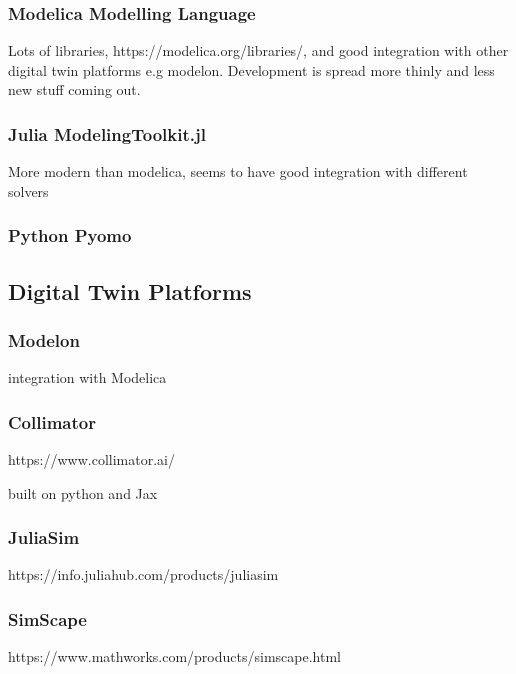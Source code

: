 \subsubsection{Modelica Modelling Language}

Lots of libraries, https://modelica.org/libraries/, and good integration with other digital twin platforms e.g modelon. Development is spread more thinly and less new stuff coming out.


\subsubsection{Julia ModelingToolkit.jl}

More modern than modelica, seems to have good integration with different solvers


\subsubsection{Python Pyomo}



\subsection{Digital Twin Platforms}




\subsubsection{Modelon}
integration with Modelica 

\subsubsection{Collimator}
https://www.collimator.ai/


built on python and Jax

\subsubsection{JuliaSim}
https://info.juliahub.com/products/juliasim


\subsubsection{SimScape}
https://www.mathworks.com/products/simscape.html


